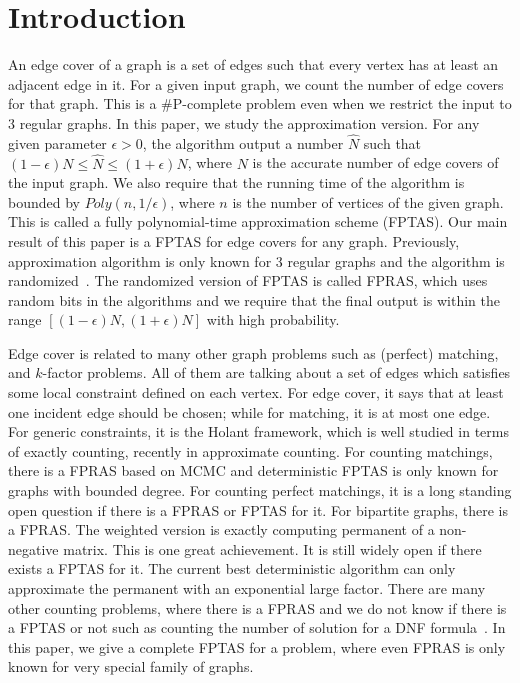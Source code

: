 \section{Introduction}
An edge cover of a graph is a set of edges such that every vertex has at least an adjacent edge in it. For a given input graph, we count the number of edge covers for that graph. This is a \#P-complete problem even when we restrict the input to 3 regular graphs. In this paper, we study the approximation version. For any given parameter $\epsilon>0$, the algorithm output a number $\hat{N}$ such that $(1-\epsilon) N\leq \hat{N} \leq (1+\epsilon) N$, where $N$ is the accurate number of edge covers of the input graph. We also require that the running time of the algorithm is bounded by $Poly(n,1/\epsilon)$, where $n$ is the number of vertices of the given graph. This is called a fully polynomial-time approximation scheme (FPTAS). Our main result of this paper is a FPTAS for edge covers for any graph. Previously, approximation algorithm is only known for 3 regular graphs and the algorithm is randomized~\cite{MFCS09}. The randomized version of FPTAS is called FPRAS, which uses random bits in the algorithms and we require that the final output is within the range $[(1-\epsilon) N, (1+\epsilon) N]$ with high probability.

Edge cover is related to many other graph problems such as (perfect) matching, and $k$-factor problems. All of them are talking about a set of edges which satisfies some local constraint defined on each vertex. For edge cover, it says that at least one incident edge should be chosen; while for matching, it is at most one edge. For generic constraints, it is the Holant framework, which is well studied in terms of exactly counting, recently in approximate counting. For counting matchings, there is a FPRAS based on MCMC and deterministic FPTAS is only known for graphs with bounded degree. For counting perfect matchings, it is a long standing open question if there is a FPRAS or FPTAS for it. For bipartite graphs, there is a FPRAS. The weighted version is exactly computing permanent of a non-negative matrix. This is one great achievement. It is still widely open if there exists a FPTAS for it. The current best deterministic algorithm can only approximate the permanent with an exponential large factor. There are many other counting problems, where there is a FPRAS and we do not know if there is a FPTAS or not such as counting the number of solution for a DNF formula~\cite{}. In this paper, we give a complete FPTAS for a problem, where even FPRAS is only known for very special family of graphs.

